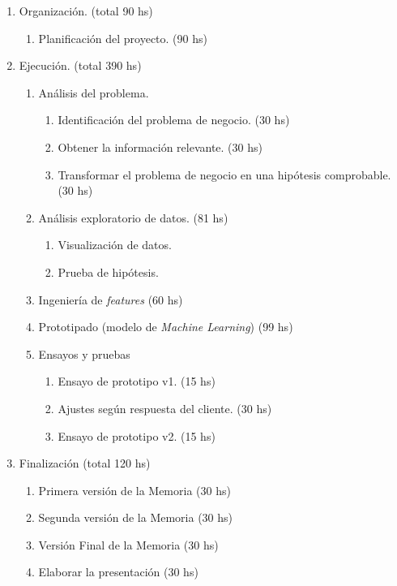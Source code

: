 \documentclass[11pt]{charter}
\begin{document}
\begin{enumerate}
  \item Organización. (total 90 hs)
    \begin{enumerate}
    \item Planificación del proyecto. (90 hs)
    \end{enumerate}
  \item Ejecución. (total 390 hs)
    \begin{enumerate}
    \item Análisis del problema. 
    \begin{enumerate}
      \item Identificación del problema de negocio. (30 hs)
      \item Obtener la información relevante. (30 hs)
      \item Transformar el problema de negocio en una hipótesis comprobable. (30 hs)
    \end{enumerate}
    \item Análisis exploratorio de datos. (81 hs) 
    \begin{enumerate}
      \item Visualización de datos.
      \item Prueba de hipótesis.
    \end{enumerate}
    \item Ingeniería de \textit{features} (60 hs)
    \item Prototipado (modelo de \textit{Machine Learning}) (99 hs)
    \item Ensayos y pruebas 
    \begin{enumerate}
      \item Ensayo de prototipo v1. (15 hs)
      \item Ajustes según respuesta del cliente. (30 hs)
      \item Ensayo de prototipo v2. (15 hs)
    \end{enumerate}
    \end{enumerate}
  \item Finalización (total 120 hs)
    \begin{enumerate}
      \item Primera versión de la Memoria (30 hs)
      \item Segunda versión de la Memoria (30 hs)
      \item Versión Final de la Memoria (30 hs)
      \item Elaborar la presentación (30 hs)
    \end{enumerate}
\end{enumerate}
\end{document}
